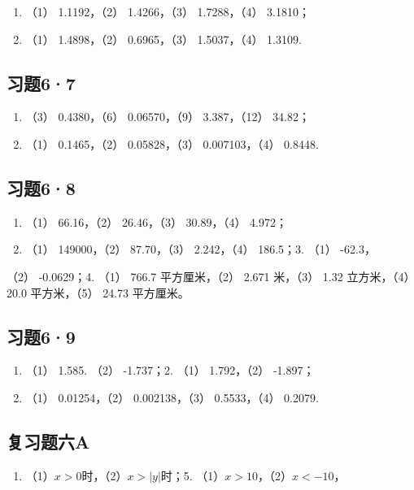 \begin{enumerate}
\item
  （1） 1.1192，（2） 1.4266，（3） 1.7288，（4） 3.1810；
\item
  （1） 1.4898，（2） 0.6965，（3） 1.5037，（4） 1.3109.
\end{enumerate}

\subsection{习题6·7}

\begin{enumerate}
\item
  （3） 0.4380，（6） 0.06570，（9） 3.387，（12） 34.82；
\item
  （1） 0.1465，（2） 0.05828，（3） 0.007103，（4） 0.8448.
\end{enumerate}

\subsection{习题6·8}

\begin{enumerate}
\item
  （1） 66.16，（2） 26.46，（3） 30.89，（4） 4.972；
\item
  （1） 149000，（2） 87.70，（3） 2.242，（4） 186.5；3. （1） -62.3，
\end{enumerate}

（2） -0.0629；4. （1） 766.7 平方厘米，（2） 2.671 米，（3） 1.32
立方米，（4） 20.0 平方米，（5） 24.73 平方厘米。

\subsection{习题6·9}

\begin{enumerate}
\item
  （1） 1.585. （2） -1.737；2. （1） 1.792，（2） -1.897；
\item
  （1） 0.01254，（2） 0.002138，（3） 0.5533，（4） 0.2079.
\end{enumerate}

\subsection{复习题六A}

\begin{enumerate}[start=3]
\item
  （1）\(x > 0\)时，（2）\(x > |y|\)时；5.
  （1）\(x > 10\)，（2）\(x < -10\)，
\end{enumerate}

